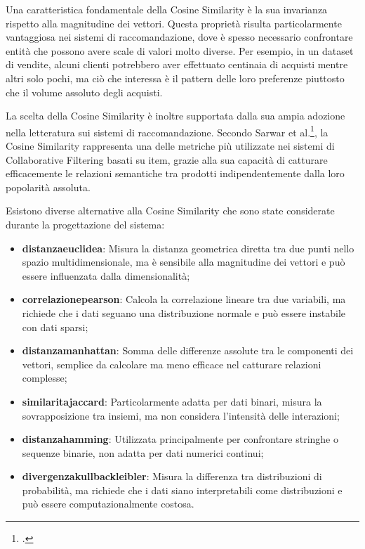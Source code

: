 Una caratteristica fondamentale della Cosine Similarity è la sua invarianza rispetto alla magnitudine dei vettori. Questa proprietà risulta particolarmente vantaggiosa nei sistemi di raccomandazione, dove è spesso necessario confrontare entità che possono avere scale di valori molto diverse. Per esempio, in un dataset di vendite, alcuni clienti potrebbero aver effettuato centinaia di acquisti mentre altri solo pochi, ma ciò che interessa è il pattern delle loro preferenze piuttosto che il volume assoluto degli acquisti.

La scelta della Cosine Similarity è inoltre supportata dalla sua ampia adozione nella letteratura sui sistemi di raccomandazione. Secondo Sarwar et al.\footcite{article:item-based-collaborative-filtering}, la Cosine Similarity rappresenta una delle metriche più utilizzate nei sistemi di Collaborative Filtering basati su item, grazie alla sua capacità di catturare efficacemente le relazioni semantiche tra prodotti indipendentemente dalla loro popolarità assoluta.

Esistono diverse alternative alla Cosine Similarity che sono state considerate durante la progettazione del sistema:

\begin{itemize}
    \item \textbf{\gls{distanzaeuclidea}}: Misura la distanza geometrica diretta tra due punti nello spazio multidimensionale, ma è sensibile alla magnitudine dei vettori e può essere influenzata dalla dimensionalità;
    \item \textbf{\gls{correlazionepearson}}: Calcola la correlazione lineare tra due variabili, ma richiede che i dati seguano una distribuzione normale e può essere instabile con dati sparsi;
    \item \textbf{\gls{distanzamanhattan}}: Somma delle differenze assolute tra le componenti dei vettori, semplice da calcolare ma meno efficace nel catturare relazioni complesse;
    \item \textbf{\gls{similaritajaccard}}: Particolarmente adatta per dati binari, misura la sovrapposizione tra insiemi, ma non considera l'intensità delle interazioni;
    \item \textbf{\gls{distanzahamming}}: Utilizzata principalmente per confrontare stringhe o sequenze binarie, non adatta per dati numerici continui;
    \item \textbf{\gls{divergenzakullbackleibler}}: Misura la differenza tra distribuzioni di probabilità, ma richiede che i dati siano interpretabili come distribuzioni e può essere computazionalmente costosa.
\end{itemize}

